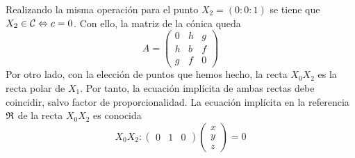 Realizando la misma operación para el punto $X_2=(0:0:1)$ se tiene que $X_2\in \mathcal{C}\Leftrightarrow c=0$. Con ello, la matriz de la cónica queda
\begin{equation*}
	A=\left( \begin{array}{ccc}
		0 & h & g\\
		h & b & f\\
		g & f & 0
	\end{array}\right) 
\end{equation*}
Por otro lado, con la elección de puntos que hemos hecho, la recta $X_0X_2$ es la recta polar de $X_1$. Por tanto, la ecuación implícita de ambas rectas debe coincidir, salvo factor de proporcionalidad. La ecuación implícita en la referencia $\mathfrak{R}$ de la recta $X_0X_2$ es conocida 
\begin{equation*}
	X_0X_2:
	\begin{pmatrix}
		0 & 1& 0
	\end{pmatrix}
	\left( \begin{array}{c}
		x\\y\\z
	\end{array}\right)=0
\end{equation*}

